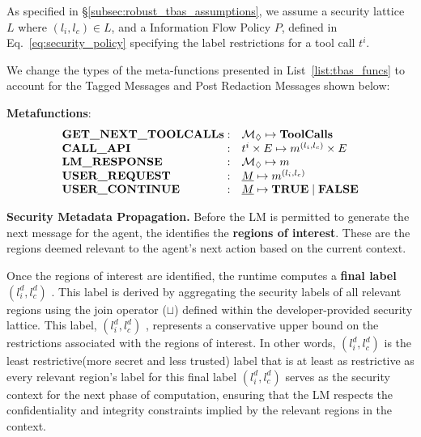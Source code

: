 As specified in \S\ref{subsec:robust_tbas_assumptions}, we assume a security lattice $L$ where $(l_i, l_c) \in L$, and a Information Flow Policy $P$, defined in Eq.~\ref{eq:security_policy} specifying the label restrictions for a tool call $t^i$.

We change the types of the meta-functions presented in List~\ref{list:tbas_funcs} to account for the Tagged Messages and Post Redaction Messages shown below:

\textbf{Metafunctions}:
{
\setlength{\abovedisplayskip}{2pt}
\setlength{\belowdisplayskip}{2pt}
\begin{equation*}
\begin{array}{l@{\;}rl}
\textbf{GET\_NEXT\_TOOLCALLs} & : & \mathcal{M}_{\redacted}  \mapsto \textbf{ToolCalls} \\
\textbf{CALL\_API} & : & t^i\times E \mapsto m^{(l_i, l_c)}\times E \\
\textbf{LM\_RESPONSE} & : & \mathcal{M}_{\redacted}  \mapsto m \\
\textbf{USER\_REQUEST} & : & \underline{M} \mapsto m^{(l_i, l_c)} \\
\textbf{USER\_CONTINUE} & : & \underline{M} \mapsto \textbf{TRUE}\mid \textbf{FALSE} 
 \label{list:robust_tbas_funcs}
\end{array}
\end{equation*}
}


\textbf{Security Metadata Propagation.}
Before the LM is permitted to generate the next message for the agent, the 
\dependencydetector identifies the \textbf{regions of interest}. These are the regions deemed relevant to the agent’s next action based on the current context. 

Once the regions of interest are identified, the runtime computes a \textbf{final label} $(l_i^d, l_c^d)$ . This label is derived by aggregating the security labels of all relevant regions using the join operator ($\sqcup$) defined within the developer-provided security lattice. This label, $(l_i^d, l_c^d)$ , represents a conservative upper bound on the restrictions associated with the regions of interest. In other words, $(l_i^d, l_c^d)$ is the least restrictive(more secret and less trusted) label that is at least as restrictive as every relevant region’s label for this final label $(l_i^d, l_c^d)$ serves as the security context for the next phase of computation, ensuring that the LM respects the confidentiality and integrity constraints implied by the relevant regions in the context.


